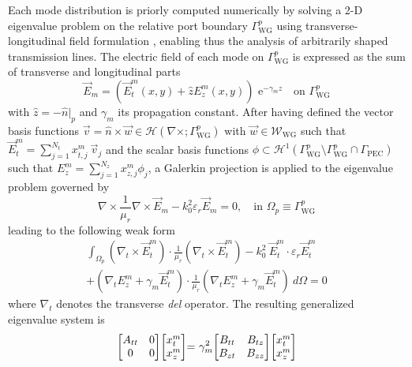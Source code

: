 \documentclass[AMA,STIX2COL]{WileyNJD-v2}
\begin{document}
Each mode distribution is priorly computed numerically by solving a \mbox{2-D} eigenvalue problem on the relative port boundary $\Gamma_\text{WG}^{p}$ using transverse-longitudinal field formulation \cite{Jiao2008}, enabling thus the analysis of arbitrarily shaped transmission lines. The electric field of each mode on $\Gamma_\text{WG}^{p}$ is expressed as the sum of transverse and longitudinal parts
\begin{equation*}
\vec{E}_m = (\vec{E}_t^m(x,y) + \hat{z} E_z^m(x,y) ) \text{ e}^{-\gamma_m z} \quad \text{on } \Gamma_\text{WG}^{p}
\end{equation*}
\noindent with $\hat{z} = -\hat{n}|_{p}$ and $\gamma_m$ its propagation constant. After having defined the vector basis functions $\vec{v} = \hat{n}\times\vec{w} \in \mathcal{H}(\nabla \times;\Gamma_\text{WG}^{p})$ with $\vec{w} \in \mathcal{W}_\text{WG}$ such that $\vec{E}_t^m = \sum_{j=1}^{N_t} x_{t,j}^m \ \vec{v}_j$ and the scalar basis functions $\phi \subset \mathcal{H}^1(\Gamma_\text{WG}^{p} \setminus \Gamma_\text{WG}^p \cap \Gamma_\text{PEC} )$ such that $E_z^m = \sum_{j=1}^{N_z} x_{z,j}^m \phi_j$, a Galerkin projection is applied to the eigenvalue problem governed by
\begin{equation}
\nabla \times \frac{1}{\mu_r} \nabla \times \vec{E}_m - {k}_0^2 {\varepsilon}_r \vec{E}_m = 0, \quad \text{in } \Omega_p \equiv  {\Gamma_\text{WG}^{p}}
\end{equation}
%
\noindent leading to the following weak form
\begin{multline}
\label{eq:fem2D}
\int_{\Omega_p} \left(\nabla_t \times \vec{E}_t^m \right) \cdot \frac{1}{\mu_r}\left(\nabla_t \times \vec{E}_t^m\right) - k_0^2 \  {\vec{E}_t^m}  \cdot \varepsilon_r \vec{E}_t^m \\
+ (\nabla_t E_z^m + \gamma_m \vec{E}_t^m )  \cdot \frac{1}{\mu_r}(\nabla_t E_z^m + \gamma_m \vec{E}_t^m) \ d\Omega = 0
\end{multline}
\noindent where 
%
$\nabla_t$ denotes the transverse \textit{del} operator.
The resulting generalized eigenvalue system is
\begin{equation}
\label{eq:eigen}
\thickmuskip=0mu
\medmuskip=0mu
\thinmuskip=0mu
\begin{bmatrix}
{A}_{tt} &0\\
0 &0
\end{bmatrix}
\begin{bmatrix}
x_t^m\\
x_z^m
\end{bmatrix} = \ \gamma_m^2
\begin{bmatrix}
{B}_{tt} &{B}_{tz}\\
{B}_{zt} &{B}_{zz}
\end{bmatrix}
\begin{bmatrix}
x_t^m\\
x_z^m
\end{bmatrix}
\end{equation}
\end{document}
